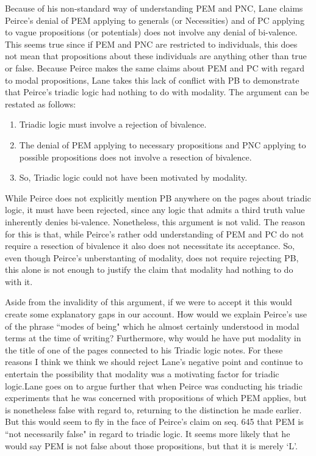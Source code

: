 \documentclass[12pt]{article}
\begin{document}
Because of his non-standard way of understanding PEM and PNC, Lane claims Peirce's denial of PEM applying to generals (or Necessities) and of PC applying to vague propositions (or potentials) does not involve any denial of bi-valence. This seems true since if PEM and PNC are restricted to individuals, this does not mean that propositions about these individuals are anything other than true or false. Because Peirce makes the same claims about PEM and PC with regard to modal propositions, Lane takes this lack of conflict with PB to demonstrate that Peirce's triadic logic had nothing to do with modality. The argument can be restated as follows: 
\begin{enumerate}
\item Triadic logic must involve a rejection of bivalence. 
\item The denial of PEM applying to necessary propositions and PNC applying to possible propositions does not involve a resection of bivalence.
\item So, Triadic logic could not have been motivated by modality.
\end{enumerate}
While Peirce does not explicitly mention PB anywhere on the pages about triadic logic, it must have been rejected, since any logic that admits a third truth value inherently denies bi-valence. Nonetheless, this argument is not valid. The reason for this is that, while Peirce's rather odd understanding of PEM and PC do not require a resection of bivalence it also does not necessitate its acceptance. So, even though Peirce's unberstanting of modality, does not require rejecting PB, this alone is not enough to justify the claim that modality had nothing to do with it.

Aside from the invalidity of this argument, if we were to accept it this would create some explanatory gaps in our account. How would we explain Peirce's use of the phrase ``modes of being" which he almost certainly understood in modal terms at the time of writing? Furthermore, why would he have put modality in the title of one of the pages connected to his Triadic logic notes. For these reasons I think we think we should reject Lane's negative point and continue to entertain the possibility that modality was a motivating factor for triadic logic.Lane goes on to argue further that when Peirce was conducting his triadic experiments that he was concerned with propositions of which PEM applies, but is nonetheless false with regard to, returning to the distinction he made earlier. But this would seem to fly in the face of Peirce's claim on seq. 645 that PEM is ``not necessarily false" in regard to triadic logic. It seems more likely that he would say PEM is not false about those propositions, but that it is merely `L'.
\end{document}
